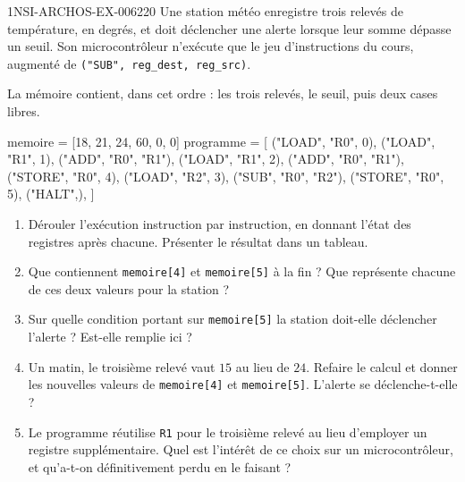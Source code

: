 \begin{exercice}{1NSI-ARCHOS-EX-006}{2}{20}
Une station météo enregistre trois relevés de température, en degrés, et doit
déclencher une alerte lorsque leur somme dépasse un seuil. Son microcontrôleur
n'exécute que le jeu d'instructions du cours, augmenté de
\lstinline{("SUB", reg_dest, reg_src)}.

La mémoire contient, dans cet ordre : les trois relevés, le seuil, puis deux
cases libres.
\begin{python}
memoire = [18, 21, 24, 60, 0, 0]
programme = [
    ("LOAD", "R0", 0),
    ("LOAD", "R1", 1),
    ("ADD", "R0", "R1"),
    ("LOAD", "R1", 2),
    ("ADD", "R0", "R1"),
    ("STORE", "R0", 4),
    ("LOAD", "R2", 3),
    ("SUB", "R0", "R2"),
    ("STORE", "R0", 5),
    ("HALT",),
]
\end{python}
\begin{enumerate}
  \item Dérouler l'exécution instruction par instruction, en donnant l'état des
    registres après chacune. Présenter le résultat dans un tableau.
  \item Que contiennent \lstinline{memoire[4]} et \lstinline{memoire[5]} à la
    fin ? Que représente chacune de ces deux valeurs pour la station ?
  \item Sur quelle condition portant sur \lstinline{memoire[5]} la station
    doit-elle déclencher l'alerte ? Est-elle remplie ici ?
  \item Un matin, le troisième relevé vaut $15$ au lieu de $24$. Refaire le
    calcul et donner les nouvelles valeurs de \lstinline{memoire[4]} et
    \lstinline{memoire[5]}. L'alerte se déclenche-t-elle ?
  \item Le programme réutilise \lstinline{R1} pour le troisième relevé au lieu
    d'employer un registre supplémentaire. Quel est l'intérêt de ce choix sur un
    microcontrôleur, et qu'a-t-on définitivement perdu en le faisant ?
\end{enumerate}
\end{exercice}
